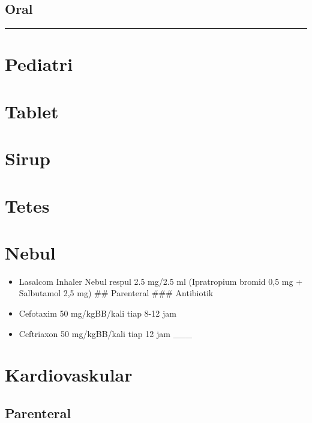 \documentclass[
]{book}
\providecommand{\tightlist}{%
  \setlength{\itemsep}{0pt}\setlength{\parskip}{0pt}}
\begin{document}
\hypertarget{oral-1}{%
\subsection{Oral}\label{oral-1}}

\begin{center}\rule{0.5\linewidth}{0.5pt}\end{center}

\hypertarget{pediatri-2}{%
\section{Pediatri}\label{pediatri-2}}

\hypertarget{tablet}{%
\section{Tablet}\label{tablet}}

\hypertarget{sirup}{%
\section{Sirup}\label{sirup}}

\hypertarget{tetes}{%
\section{Tetes}\label{tetes}}

\hypertarget{nebul}{%
\section{Nebul}\label{nebul}}

\begin{itemize}
\tightlist
\item
  Lasalcom Inhaler Nebul respul 2.5 mg/2.5 ml (Ipratropium bromid 0,5 mg + Salbutamol 2,5 mg)
  \#\# Parenteral
  \#\#\# Antibiotik
\item
  Cefotaxim 50 mg/kgBB/kali tiap 8-12 jam
\item
  Ceftriaxon 50 mg/kgBB/kali tiap 12 jam
  \_\_\_
\end{itemize}

\hypertarget{kardiovaskular-3}{%
\section{Kardiovaskular}\label{kardiovaskular-3}}

\hypertarget{parenteral-2}{%
\subsection{Parenteral}\label{parenteral-2}}
\end{document}

